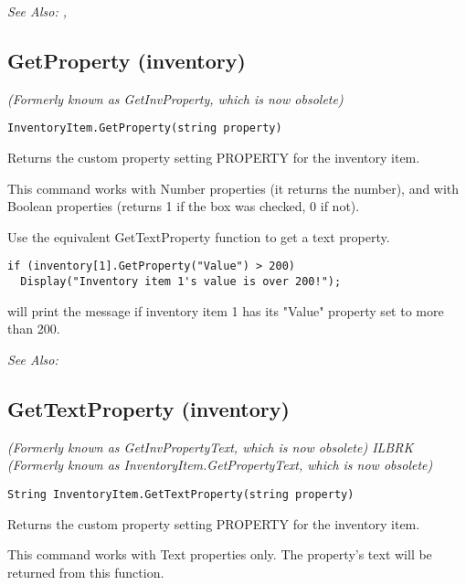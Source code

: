 \it{See Also:} ,


\subsection{GetProperty (inventory)}\label{InventoryItem.GetProperty}%

\it{(Formerly known as GetInvProperty, which is now obsolete)}

\begin{verbatim}
InventoryItem.GetProperty(string property)
\end{verbatim}
Returns the custom property setting PROPERTY for the inventory item.

This command works with Number properties (it returns the number), and with Boolean
properties (returns 1 if the box was checked, 0 if not).

Use the equivalent GetTextProperty function to get a text property.

\begin{verbatim}
if (inventory[1].GetProperty("Value") > 200)
  Display("Inventory item 1's value is over 200!");
\end{verbatim}
will print the message if inventory item 1 has its "Value" property set to more than 200.

\it{See Also:} 


\subsection{GetTextProperty (inventory)}\label{InventoryItem.GetTextProperty}%

\it{(Formerly known as GetInvPropertyText, which is now obsolete)} ILBRK
\it{(Formerly known as InventoryItem.GetPropertyText, which is now obsolete)}

\begin{verbatim}
String InventoryItem.GetTextProperty(string property)
\end{verbatim}
Returns the custom property setting PROPERTY for the inventory item.

This command works with Text properties only. The property's text will be
returned from this function.

